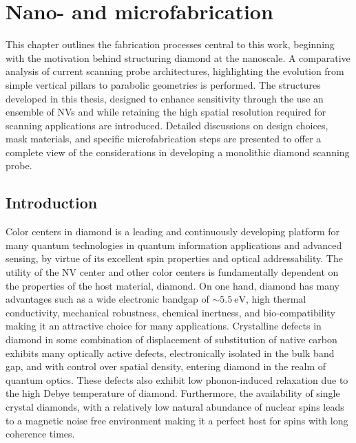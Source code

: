 \chapter{Nano- and microfabrication}\label{sec:fabrication}

This chapter outlines the fabrication processes central to this work, beginning with the motivation behind structuring diamond at the nanoscale. A comparative analysis of current scanning probe architectures, highlighting the evolution from simple vertical pillars to parabolic geometries is performed. The structures developed in this thesis, designed to enhance sensitivity through the use an ensemble of NVs and while retaining the high spatial resolution required for scanning applications are introduced. Detailed discussions on design choices, mask materials, and specific microfabrication steps are presented to offer a complete view of the considerations in developing a monolithic diamond scanning probe.

\section{Introduction}
Color centers in diamond is a leading and continuously developing platform for many quantum technologies in quantum information applications\cite{childressDiamondNVCenters2013, wrachtrupProcessingQuantumInformation2006} and advanced sensing\cite{taylorHighsensitivityDiamondMagnetometer2008, schirhaglNitrogenVacancyCentersDiamond2014}, by virtue of its excellent spin properties and optical addressability. The utility of the \gls{NV} center and other color centers is fundamentally dependent on the properties of the host material, diamond. On one hand, diamond has many advantages such as a wide electronic bandgap of $\sim\qty{5.5}{\electronvolt}$, high thermal conductivity, mechanical robustness, chemical inertness, and bio-compatibility making it an attractive choice for many applications. Crystalline defects in diamond in some combination of displacement of substitution of native carbon exhibits many optically active defects, electronically isolated in the bulk band gap, and with control over spatial density, entering diamond in the realm of quantum optics. These defects also exhibit low phonon-induced relaxation due to the high Debye temperature of diamond. Furthermore, the availability of single crystal diamonds, with a relatively low natural abundance of nuclear spins leads to a magnetic noise free environment making it a perfect host for spins with long coherence times\cite{balasubramanianUltralongSpinCoherence2009}.

